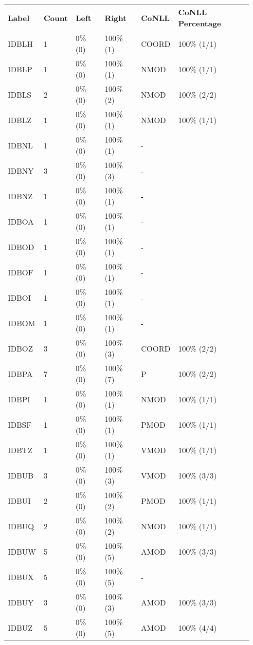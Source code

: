 \begin{figure*}
\begin{tabular}{|l|l|l|l||l|l|}
\hline
Label & Count & Left & Right & CoNLL & CoNLL Percentage\\ 
\hline
 IDBLH & 1 & 0\% (0) & 100\% (1) & COORD & 100\% (1/1) \\ 
\hline
 IDBLP & 1 & 0\% (0) & 100\% (1) & NMOD & 100\% (1/1) \\ 
\hline
 IDBLS & 2 & 0\% (0) & 100\% (2) & NMOD & 100\% (2/2) \\ 
\hline
 IDBLZ & 1 & 0\% (0) & 100\% (1) & NMOD & 100\% (1/1) \\ 
\hline
 IDBNL & 1 & 0\% (0) & 100\% (1) & - &  \\ 
\hline
 IDBNY & 3 & 0\% (0) & 100\% (3) & - &  \\ 
\hline
 IDBNZ & 1 & 0\% (0) & 100\% (1) & - &  \\ 
\hline
 IDBOA & 1 & 0\% (0) & 100\% (1) & - &  \\ 
\hline
 IDBOD & 1 & 0\% (0) & 100\% (1) & - &  \\ 
\hline
 IDBOF & 1 & 0\% (0) & 100\% (1) & - &  \\ 
\hline
 IDBOI & 1 & 0\% (0) & 100\% (1) & - &  \\ 
\hline
 IDBOM & 1 & 0\% (0) & 100\% (1) & - &  \\ 
\hline
 IDBOZ & 3 & 0\% (0) & 100\% (3) & COORD & 100\% (2/2) \\ 
\hline
 IDBPA & 7 & 0\% (0) & 100\% (7) & P & 100\% (2/2) \\ 
\hline
 IDBPI & 1 & 0\% (0) & 100\% (1) & NMOD & 100\% (1/1) \\ 
\hline
 IDBSF & 1 & 0\% (0) & 100\% (1) & PMOD & 100\% (1/1) \\ 
\hline
 IDBTZ & 1 & 0\% (0) & 100\% (1) & VMOD & 100\% (1/1) \\ 
\hline
 IDBUB & 3 & 0\% (0) & 100\% (3) & VMOD & 100\% (3/3) \\ 
\hline
 IDBUI & 2 & 0\% (0) & 100\% (2) & PMOD & 100\% (1/1) \\ 
\hline
 IDBUQ & 2 & 0\% (0) & 100\% (2) & NMOD & 100\% (1/1) \\ 
\hline
 IDBUW & 5 & 0\% (0) & 100\% (5) & AMOD & 100\% (3/3) \\ 
\hline
 IDBUX & 5 & 0\% (0) & 100\% (5) & - &  \\ 
\hline
 IDBUY & 3 & 0\% (0) & 100\% (3) & AMOD & 100\% (3/3) \\ 
\hline
 IDBUZ & 5 & 0\% (0) & 100\% (5) & AMOD & 100\% (4/4) \\ 

\end{tabular}
\end{figure*}
